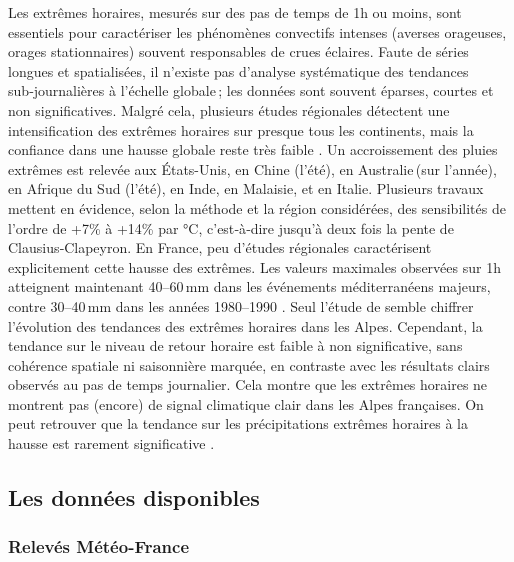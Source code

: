 \documentclass[
  article,
  nofooter,
  noheadings]{jss}
\begin{document}
Les extrêmes horaires, mesurés sur des pas de temps de 1h ou moins, sont
essentiels pour caractériser les phénomènes convectifs intenses (averses
orageuses, orages stationnaires) souvent responsables de crues éclaires.
Faute de séries longues et spatialisées, il n'existe pas d'analyse
systématique des tendances sub‑journalières à l'échelle globale\,; les
données sont souvent éparses, courtes et non significatives. Malgré
cela, plusieurs études régionales détectent une intensification des
extrêmes horaires sur presque tous les continents, mais la confiance
dans une hausse globale reste très faible \citep{IPCC2021}. Un
accroissement des pluies extrêmes est relevée aux États-Unis, en Chine
(l'été), en Australie\,(sur l'année), en Afrique du Sud (l'été), en
Inde, en Malaisie, et en Italie. Plusieurs travaux mettent en évidence,
selon la méthode et la région considérées, des sensibilités de l'ordre
de +7\% à +14\% par °C, c'est‑à‑dire jusqu'à deux fois la pente de
Clausius‑Clapeyron. En France, peu d'études régionales caractérisent
explicitement cette hausse des extrêmes. Les valeurs maximales observées
sur 1h atteignent maintenant 40--60\,mm dans les événements
méditerranéens majeurs, contre 30--40\,mm dans les années 1980--1990
\citep{meteofrance2024_episodesMediterraneens}. Seul l'étude de
\citet{Berghald2025} semble chiffrer l'évolution des tendances des
extrêmes horaires dans les Alpes. Cependant, la tendance sur le niveau
de retour horaire est faible à non significative, sans cohérence
spatiale ni saisonnière marquée, en contraste avec les résultats clairs
observés au pas de temps journalier. Cela montre que les extrêmes
horaires ne montrent pas (encore) de signal climatique clair dans les
Alpes françaises. On peut retrouver que la tendance sur les
précipitations extrêmes horaires à la hausse est rarement significative
\citep{Soubeyroux01022015}.

\subsection{Les données disponibles}\label{les-donnuxe9es-disponibles}

\subsubsection{Relevés
Météo-France}\label{relevuxe9s-muxe9tuxe9o-france}
\end{document}
